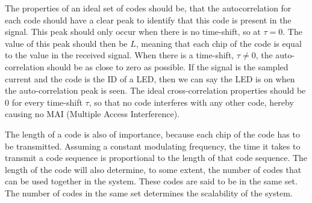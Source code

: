 



The properties of an ideal set of codes should be, that the autocorrelation for each code should have a clear peak to identify that this code is present in the signal.
This peak should only occur when there is no time-shift, so at $\tau = 0$.
The value of this peak should then be $L$, meaning that each chip of the code is equal to the value in the received signal.
When there is a time-shift, $\tau \neq 0$, the auto-correlation should be as close to zero as possible.
If the signal is the sampled current and the code is the ID of a LED, then we can say the LED is on when the auto-correlation peak is seen.
The ideal cross-correlation properties should be $0$ for every time-shift $\tau$, so that no code interferes with any other code, hereby causing no MAI (Multiple Access Interference).



The length of a code is also of importance, because each chip of the code has to be transmitted.
Assuming a constant modulating frequency, the time it takes to transmit a code sequence is proportional to the length of that code sequence.
The length of the code will also determine, to some extent, the number of codes that can be used together in the system.
These codes are said to be in the same set.
The number of codes in the same set determines the scalability of the system.




